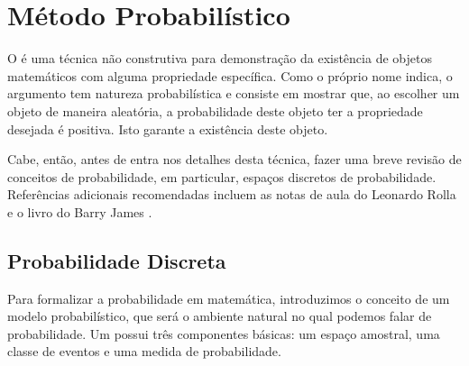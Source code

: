 
\chapter{Método Probabilístico}
\label{chap:prob}


O  é uma técnica não construtiva para demonstração da existência de objetos matemáticos com alguma propriedade específica. Como o próprio nome indica, o argumento tem natureza probabilística e consiste em mostrar que, ao escolher um objeto de maneira aleatória, a probabilidade deste objeto ter a propriedade desejada é positiva. Isto garante a existência deste objeto.

Cabe, então, antes de entra nos detalhes desta técnica, fazer uma breve revisão de conceitos de probabilidade, em particular, espaços discretos de probabilidade. Referências adicionais recomendadas incluem as notas de aula do Leonardo Rolla \cite{rolla} e o livro do Barry James \cite{barryjames}.


\section{Probabilidade Discreta}

Para formalizar a probabilidade em matemática, introduzimos o conceito de um modelo probabilístico, que será o ambiente natural no qual podemos falar de probabilidade.
Um  possui três componentes básicas: um espaço amostral, uma classe de eventos e uma medida de probabilidade.

